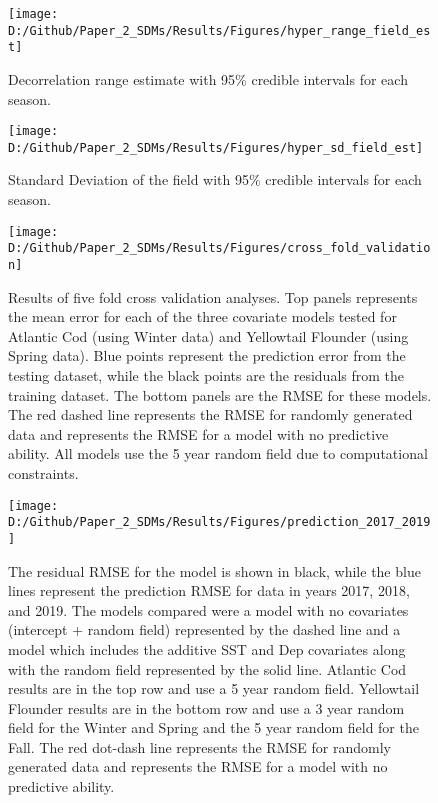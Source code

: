 \documentclass[
]{article}
\begin{document}
\begin{landscape}
\clearpage

\begin{figure}
\texttt{[image: D:/Github/Paper\_2\_SDMs/Results/Figures/hyper\_range\_field\_est]} \caption{Decorrelation range estimate with 95\% credible intervals for each season.}\label{fig:hyper-range-var-est}
\end{figure}

\clearpage

\begin{figure}
\texttt{[image: D:/Github/Paper\_2\_SDMs/Results/Figures/hyper\_sd\_field\_est]} \caption{Standard Deviation of the field with 95\% credible intervals for each season.}\label{fig:hyper-sd-var-est}
\end{figure}

\newpage
\begin{figure}
\texttt{[image: D:/Github/Paper\_2\_SDMs/Results/Figures/cross\_fold\_validation]} \caption{Results of five fold cross validation analyses. Top panels represents the mean error for each of the three covariate models tested for Atlantic Cod (using Winter data) and Yellowtail Flounder (using Spring data). Blue points represent the prediction error from the testing dataset, while the black points are the residuals from the training dataset. The bottom panels are the RMSE for these models.  The red dashed line represents the RMSE for randomly generated data and represents the RMSE for a model with no predictive ability. All models use the 5 year random field due to computational constraints.}\label{fig:folds}
\end{figure}

\newpage
\begin{figure}
\texttt{[image: D:/Github/Paper\_2\_SDMs/Results/Figures/prediction\_2017\_2019]} \caption{The residual RMSE for the model is shown in black, while the blue lines represent the prediction RMSE for data in years 2017, 2018, and 2019. The models compared were a model with no covariates (intercept + random field) represented by the dashed line and a model which includes the additive SST and Dep covariates along with the random field represented by the solid line. Atlantic Cod results are in the top row and use a 5 year random field. Yellowtail Flounder results are in the bottom row and use a 3 year random field for the Winter and Spring and the 5 year random field for the Fall. The red dot-dash line represents the RMSE for randomly generated data and represents the RMSE for a model with no predictive ability.}\label{fig:pred-17-19}
\end{figure}

\end{landscape}
\end{document}
